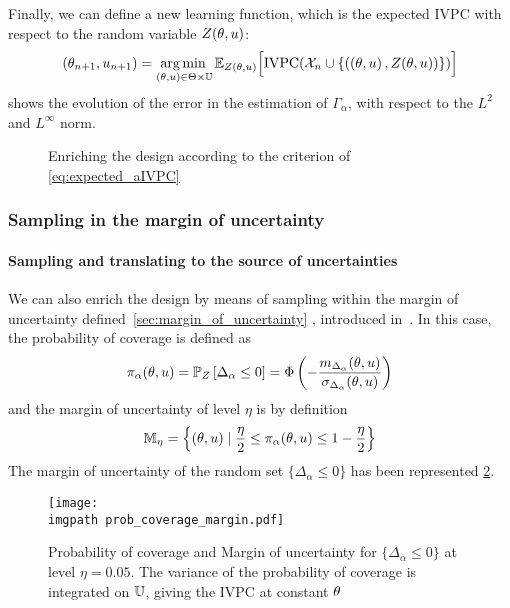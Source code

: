 \documentclass[../../Main_ManuscritThese.tex]{subfiles}
\newcommand\imgpath{/home/victor/acadwriting/Manuscrit/Text/Chapter4/img/}
\begin{document}
Finally, we can define a new learning function, which is the expected
$\mathrm{IVPC}$ with respect to the random variable $Z(\theta, u)$:
\begin{equation}
  \label{eq:expected_aIVPC}
  (\theta_{n+1},u_{n+1}) = \operatorname*{arg\,min \,}_{(\theta, u)\in \Theta\times\mathbb{U}} \mathbb{E}_{Z(\theta, u)}\Big[\mathrm{IVPC}(\mathcal{X}_n \cup \{   \left(\left(\theta, u \right), Z(\theta, u) \right)  \} )     \Big]
\end{equation}
 shows the evolution of the error in the
estimation of $\Gamma_{\alpha}$, with respect to the $L^2$ and
$L^{\infty}$ norm.
\begin{figure}[ht]
  \centering
  
  \caption{\label{fig:IVPC_enrichment} Enriching the design according to the criterion of \cref{eq:expected_aIVPC}}
\end{figure}

\subsubsection{Sampling in the margin of uncertainty}
\paragraph{Sampling and translating to the source of uncertainties}
We can also enrich the design by means of sampling within the margin
of uncertainty defined~\cref{sec:margin_of_uncertainty}
, introduced
in~\cite{echard_ak-mcs_2011,schobi_rare_2017,razaaly_rare_2019}. %
In this case, the probability of coverage is defined as
\begin{equation}
  \pi_{\alpha}(\theta, u) = \mathbb{P}_{Z}\left[\Delta_{\alpha} \leq 0\right] = \Phi\left(-\frac{m_{\Delta_\alpha}(\theta, u)}{\sigma_{\Delta_\alpha}(\theta, u)}\right)
\end{equation}
and the margin of uncertainty of level $\eta$ is by definition
\begin{equation}
  \mathbb{M}_{\eta} = \left\{ (\theta, u) \mid \frac{\eta}{2} \leq \pi_{\alpha}(\theta, u) \leq 1 - \frac{\eta}{2}\right\}
\end{equation}
The margin of uncertainty of the random set $\{\Delta_{\alpha} \leq 0\}$ has been represented \cref{fig:prob_coverage_margin}.
\begin{figure}[ht]
  \centering
  \texttt{[image: \\imgpath prob\_coverage\_margin.pdf]}
  \caption{\label{fig:prob_coverage_margin} Probability of coverage
    and Margin of uncertainty for $\{\Delta_{\alpha} \leq 0\}$ at
    level $\eta=0.05$. The variance of the probability of coverage is
    integrated on $\mathbb{U}$, giving the IVPC at constant $\theta$}
\end{figure}
\end{document}
